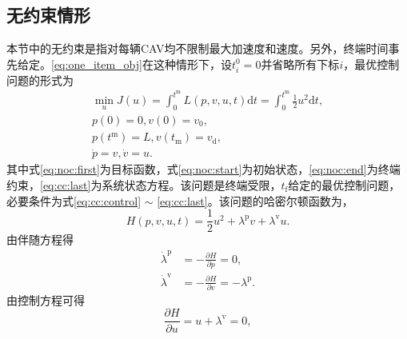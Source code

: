 \subsection{无约束情形}
\label{ssec:noc}
本节中的无约束是指对每辆CAV均不限制最大加速度和速度。另外，终端时间事先给定。\ref{eq:one_item_obj}在这种情形下，设$t_i^{0}=0$并省略所有下标$i$，最优控制问题的形式为
\begin{gather}
\min_{u} J(u)=\int_{0}^{t^\mathrm{m}}L(p,v,u,t)\mathrm{d}t=\int_{0}^{t^\mathrm{m}}\frac12 u^2\mathrm{d}t,\label{eq:noc:first}\\
p(0)=0, v(0)=v_0,\label{eq:noc:start}\\
p(t^\mathrm{m})=L, v(t_\mathrm{m})=v_\mathrm{d},\label{eq:noc:end}\\
\dot{p}=v, \dot{v}=u. \label{eq:noc:last}
\end{gather}
其中式\ref{eq:noc:first}为目标函数，式\ref{eq:noc:start}为初始状态，\ref{eq:noc:end}为终端约束，\ref{eq:cc:last}为系统状态方程。该问题是终端受限，$t_\mathrm{f}$给定的最优控制问题，必要条件为式\ref{eq:cc:control} $\sim$ \ref{eq:cc:last}。该问题的哈密尔顿函数为，
\begin{equation}
H(p,v,u,t)=\frac12 u^2+\lambda^\mathrm{p}v + \lambda^\mathrm{v}u.
\end{equation}
由伴随方程得
\begin{align}
\dot{\lambda}^\mathrm{p}&=-\frac{\partial H}{\partial p}=0, \label{eq:dlp}\\
\dot{\lambda}^\mathrm{v}&=-\frac{\partial H}{\partial v}=-\lambda^\mathrm{p}. \label{eq:dlv}
\end{align}
由控制方程可得
\begin{equation}
\frac{\partial H}{\partial u}=u+\lambda^\mathrm{v}=0,
\label{eq:uwrtlv}
\end{equation}

